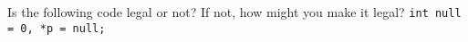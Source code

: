 %
%
\begin{question}
Is the following code legal or not? If not, how might you
make it legal?
\verb|int null = 0, *p = null;|
\end{question}
